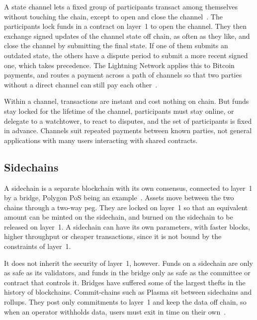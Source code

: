 A state channel lets a fixed group of participants transact among themselves without touching the chain, except to open and close the channel~\cite{gudgeon2020sok}.
The participants lock funds in a contract on layer~1 to open the channel.
They then exchange signed updates of the channel state off chain, as often as they like, and close the channel by submitting the final state.
If one of them submits an outdated state, the others have a dispute period to submit a more recent signed one, which takes precedence.
The Lightning Network applies this to Bitcoin payments, and routes a payment across a path of channels so that two parties without a direct channel can still pay each other~\cite{poon2016lightning}.

Within a channel, transactions are instant and cost nothing on chain.
But funds stay locked for the lifetime of the channel, participants must stay online, or delegate to a watchtower, to react to disputes, and the set of participants is fixed in advance.
Channels suit repeated payments between known parties, not general applications with many users interacting with shared contracts.

\subsection{Sidechains}\label{sec:bg:l2:sidechains}


A sidechain is a separate blockchain with its own consensus, connected to layer~1 by a bridge, Polygon PoS being an example~\cite{gudgeon2020sok}.
Assets move between the two chains through a two-way peg.
They are locked on layer~1 so that an equivalent amount can be minted on the sidechain, and burned on the sidechain to be released on layer~1.
A sidechain can have its own parameters, with faster blocks, higher throughput or cheaper transactions, since it is not bound by the constraints of layer~1.

It does not inherit the security of layer~1, however.
Funds on a sidechain are only as safe as its validators, and funds in the bridge only as safe as the committee or contract that controls it.
Bridges have suffered some of the largest thefts in the history of blockchains. 
Commit-chains such as Plasma sit between sidechains and rollups.
They post only commitments to layer~1 and keep the data off chain, so when an operator withholds data, users must exit in time on their own~\cite{gudgeon2020sok}.

